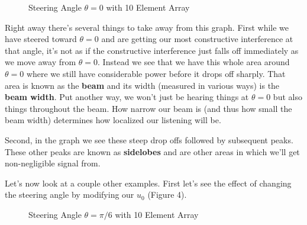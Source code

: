 \documentclass[10pt,a5paper]{book}
\begin{document}
\begin{figure}[!htb]
\caption{\label{fig:my-label} Steering Angle $\theta=0$ with 10 Element Array}
\end{figure}

Right away there's several things to take away from this graph. First while we have steered toward $\theta=0$ and are getting our most constructive interference at that angle, it's not as if the constructive interference just falls off immediately as we move away from $\theta=0$. Instead we see that we have this whole area around $\theta=0$ where we still have considerable power before it drops off sharply. That area is known as the \textbf{beam} and its width (measured in various ways) is the \textbf{beam width}. Put another way, we won't just be hearing things at $\theta=0$ but also things throughout the beam. How narrow our beam is (and thus how small the beam width) determines how localized our listening will be. 

Second, in the graph we see these steep drop offs followed by subsequent peaks. These other peaks are known as \textbf{sidelobes} and are other areas in which we'll get non-negligible signal from. 

Let's now look at a couple other examples. First let's see the effect of changing the steering angle by modifying our $u_0$ (Figure 4). 

\begin{figure}[!htb]
\caption{\label{fig:my-label} Steering Angle $\theta=\pi/6$ with 10 Element Array}
\end{figure}
\end{document}
